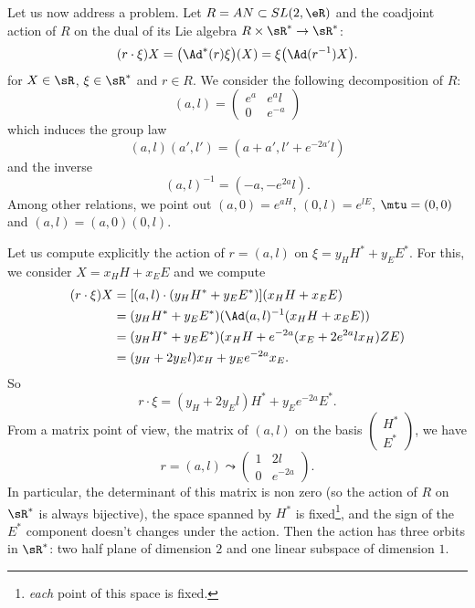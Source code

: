 Let us now address a problem. Let $R=AN\subset SL(2,\eR)$ and the coadjoint action of $R$ on the dual of its Lie algebra $R\times\sR^*\to\sR^*$:
\begin{equation}
	(r\cdot \xi)X=\big( \Ad^*(r)\xi \big)(X)=\xi\big( \Ad(r^{-1})X \big).
\end{equation}
for $X\in\sR$, $\xi\in\sR^*$ and $r\in R$. We consider the following decomposition of $R$:
\begin{equation}  \label{eq:defeaeal}
	(a,l)=
	\begin{pmatrix}
		e^a & e^al   \\
		0   & e^{-a}
	\end{pmatrix}
\end{equation}
which induces the group law
\begin{equation}
	(a,l)(a',l')=(a+a',l'+e^{-2a'}l)
\end{equation}
and the inverse
\begin{equation}
	(a,l)^{-1}=(-a,-e^{2a}l).
\end{equation}
Among other relations, we point out $(a,0)=e^{aH}$, $(0,l)=e^{lE}$, $\mtu=(0,0)$ and $(a,l)=(a,0)(0,l)$.

Let us compute explicitly the action of $r=(a,l)$ on $\xi=y_H H^*+y_EE^*$. For this, we consider $X=x_H H+x_EE$ and we compute
\begin{equation}
	\begin{split}
		(r\cdot \xi)X&=[(a,l)\cdot (y_HH^*+y_EE^*)](x_HH+x_EE)\\
		&=(y_HH^*+y_EE^*)(\Ad(a,l)^{-1} (x_HH+x_EE) )\\
		&=(y_HH^*+y_EE^*)(x_HH+e^{-2a}(x_E+2e^{2a}lx_H)ZE)\\
		&=(y_H+2y_El)x_H+y_E e^{-2a}x_E.
	\end{split}
\end{equation}
So
\begin{equation}
	r\cdot \xi=(y_H+2y_El)H^*+y_Ee^{-2a}E^*.
\end{equation}
From a matrix point of view, the matrix of $(a,l)$ on the basis
$\begin{pmatrix}
		H^* \\
		E^*
	\end{pmatrix}
$, we have
\[
	r=(a,l)\leadsto
	\begin{pmatrix}
		1 & 2l \\0&e^{-2a}
	\end{pmatrix}.
\]
In particular, the determinant of this matrix is non zero (so the action of $R$ on $\sR^*$ is always bijective), the space spanned by $H^*$ is fixed\footnote{\emph{each} point of this space is fixed.}, and the sign of the $E^*$ component doesn't changes under the action. Then the action has three orbits in $\sR^*$: two half plane of dimension $2$ and one linear subspace of dimension $1$.


